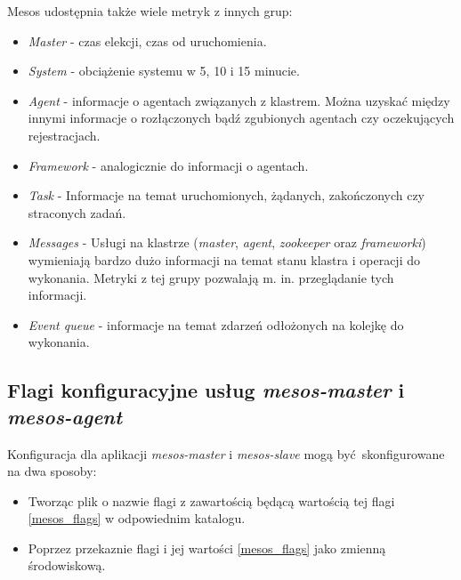 \documentclass[10pt,a4paper,titlepage,twoside]{report}
\begin{document}
Mesos udostępnia także wiele metryk z innych grup:
\begin{itemize}
\item \textit{Master} - czas elekcji, czas od uruchomienia.
\item \textit{System} - obciążenie systemu w 5, 10 i 15 minucie.
\item \textit{Agent} - informacje o agentach związanych z klastrem. Można uzyskać między innymi informacje o rozłączonych bądź zgubionych agentach czy oczekujących rejestracjach.
\item \textit{Framework} - analogicznie do informacji o agentach.
\item \textit{Task} - Informacje na temat uruchomionych, żądanych, zakończonych czy straconych zadań.
\item \textit{Messages} - Usługi na klastrze (\textit{master}, \textit{agent}, \textit{zookeeper} oraz \textit{frameworki}) wymieniają bardzo dużo informacji na temat stanu klastra i operacji do wykonania. Metryki z tej grupy pozwalają m. in. przeglądanie tych informacji.
\item \textit{Event queue} - informacje na temat zdarzeń odłożonych na kolejkę do wykonania.
\end{itemize}

\subsection{Flagi konfiguracyjne usług \textit{mesos-master} i \textit{mesos-agent}}
Konfiguracja dla aplikacji \textit{mesos-master} i \textit{mesos-slave} mogą być skonfigurowane na dwa sposoby:
\begin{itemize}
\item Tworząc plik o nazwie flagi z zawartością będącą wartością tej flagi \ref{mesos_flags} w odpowiednim katalogu.
\item Poprzez przekaznie flagi i jej wartości \ref{mesos_flags} jako zmienną środowiskową.
\end{itemize}
\end{document}
